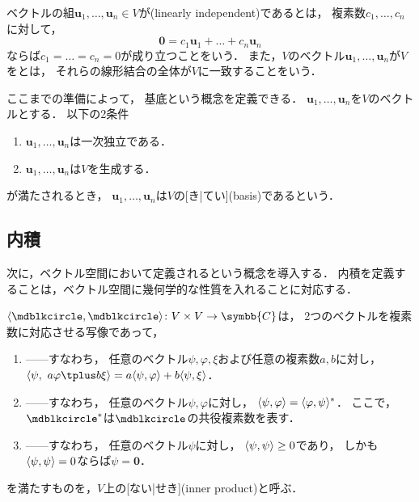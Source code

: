\documentclass[
]{sotsu}
\newcommand{\fire}[1]{\textcolor{fire}{#1}}
\begin{document}
ベクトルの組$\symbf{u}_1, \dots, \symbf{u}_n \in V$が(linearly independent)であるとは，
複素数$c_1, \dots, c_n$に対して，
\begin{equation}
    \label{eq:linearly-independent}
    \symbf{0} = c_1 \symbf{u}_1 + \dots + c_n \symbf{u}_n
\end{equation}
ならば$c_1 = \dots = c_n = 0$が成り立つことをいう．
また，$V$のベクトル$\symbf{u}_1, \dots, \symbf{u}_n$が$V$をとは，
それらの線形結合の全体が$V$に一致することをいう．

ここまでの準備によって，
基底という概念を定義できる．
$\symbf{u}_1, \dots, \symbf{u}_n$を$V$のベクトルとする．
以下の2条件
\begin{enumerate}
    \item $\symbf{u}_1, \dots, \symbf{u}_n$は一次独立である．
    \item $\symbf{u}_1, \dots, \symbf{u}_n$は$V$を生成する．
\end{enumerate}
が満たされるとき，
$\symbf{u}_1, \dots, \symbf{u}_n$は$V$の[き|てい](basis)であるという．







\subsection{内積}

次に，ベクトル空間において定義されるという概念を導入する．
内積を定義することは，ベクトル空間に幾何学的な性質を入れることに対応する．

$\iparen{\bigdot, \bigdot} \colon V \times V \to \symbb{C}$は，
2つのベクトルを複素数に対応させる写像であって，
\begin{enumerate}
    \item \label{innerp:linear} 
        ------すなわち，
        \fire{任意のベクトル$\psi, \varphi, \xi$}および\fire{任意の複素数$a, b$}に対し，
        $\iparen{\psi, \  a \varphi \vecplus b \xi} = a \iparen{\psi, \varphi} + b \iparen{\psi, \xi}$．
    \item \label{innerp:conjugate-symmetry} 
        ------すなわち，
        \fire{任意のベクトル$\psi, \varphi$}に対し，
        $\iparen{\psi, \varphi} = \conj{\iparen{\varphi, \psi}}$．
        ここで，$\conj{\bigdot}$は$\bigdot$の共役複素数を表す．
    \item \label{innerp:positive-definiteness}
        ------すなわち，
        \fire{任意のベクトル$\psi$}に対し，
        $\langle \psi, \psi \rangle \geq 0$であり，
        しかも$\langle \psi, \psi \rangle = 0$ならば$\psi = \symbf{0}$．
\end{enumerate}
を満たすものを，$V$上の[ない|せき](inner product)と呼ぶ．
\end{document}
